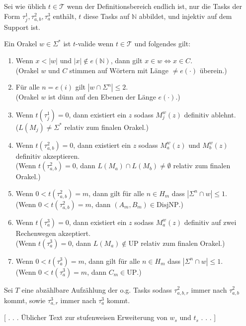 \documentclass[nofonts]{uebung}
\theoremstyle{definition}
\def\UP{\ensuremath{\mathrm{UP}}}
\def\DisjNP{\ensuremath{\mathrm{DisjNP}}}
\begin{document}
Sei wie üblich $t\in \mathcal T$ wenn der Definitionsbereich endlich ist, nur die Tasks der Form $\tau^1_j, \tau^2_{a,b}, \tau^3_a$ enthält, $t$ diese Tasks auf $\mathbb N$ abbildet, und injektiv auf dem Support ist.

Ein Orakel $w\in\Sigma^*$ ist $t$-valide wenn $t\in\mathcal T$ und folgendes gilt:
\begin{enumerate}[label={V\arabic*}]
    \item Wenn $x<|w|$ und $|x|\not\in e(\mathbb N)$, dann gilt $x\in w\iff x\in C$.\\
        (Orakel $w$ und $C$ stimmen auf Wörtern mit Länge $\neq e(\cdot)$ überein.)
    \item Für alle $n=e(i)$ gilt $|w\cap \Sigma^n|\leq 2$.\\
        (Orakel $w$ ist dünn auf den Ebenen der Länge $e(\cdot)$.)
    \item Wenn $t(\tau^1_j)=0$, dann existiert ein $z$ sodass $M_j^w(z)$ definitiv ablehnt.\\
        ($L(M_j)\neq \Sigma^*$ relativ zum finalen Orakel.)
    \item Wenn $t(\tau^2_{a,b})=0$, dann existiert ein $z$ sodass $M_a^w(z)$ und $M_b^w(z)$ definitiv akzeptieren.\\
        (Wenn $t(\tau^2_{a,b})=0$, dann $L(M_a)\cap L(M_b)\neq \emptyset$ relativ zum finalen Orakel.)
    \item Wenn $0<t(\tau^2_{a,b})=m$, dann gilt für alle $n\in H_m$ dass $|\Sigma^{n}\cap w|\leq 1$.\\
        (Wenn $0<t(\tau^2_{a,b})=m$, dann $(A_m,B_m)\in\DisjNP$.)
    \item Wenn $t(\tau^3_{a})=0$, dann existiert ein $z$ sodass $M_a^w(z)$ definitiv auf zwei Rechenwegen akzeptiert.\\
        (Wenn $t(\tau^3_{a})=0$, dann $L(M_a)\not\in \UP$ relativ zum finalen Orakel.)
    \item Wenn $0<t(\tau^3_{a})=m$, dann gilt für alle $n\in H_m$ dass $|\Sigma^n\cap w|\leq 1$.\\
        (Wenn $0<t(\tau^3_{a})=m$, dann $C_m\in\UP$.)
\end{enumerate}

Sei $T$ eine abzählbare Aufzählung der o.g. Tasks sodass $\tau^2_{a,b,r}$ immer nach $\tau^2_{a,b}$ kommt, sowie $\tau^3_{a,r}$ immer nach $\tau^3_a$ kommt.

[ . . . Üblicher Text zur stufenweisen Erweiterung von $w_s$ und $t_s$ . . . ]
\end{document}
